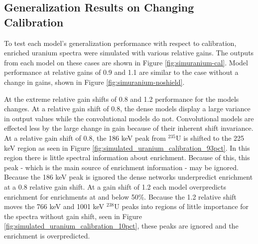 \subsection{Generalization Results on Changing Calibration} \label{section_uranium_sim_cal}

To test each model's generalization performance with respect to calibration, enriched uranium spectra were simulated with various relative gains. The outputs from each model on these cases are shown in Figure \ref{fig:simuranium-cal}. Model performance at relative gains of 0.9 and 1.1 are similar to the case without a change in gains, shown in Figure \ref{fig:simuranium-noshield}.

At the extreme relative gain shifts of 0.8 and 1.2 performance for the models changes. At a relative gain shift of 0.8, the dense models display a large variance in output values while the convolutional models do not. Convolutional models are effected less by the large change in gain because of their inherent shift invariance. At a relative gain shift of 0.8, the 186 keV peak from $^{235}$U is shifted to the 225 keV region as seen in Figure \ref{fig:simulated_uranium_calibration_93pct}. In this region there is little spectral information about enrichment. Because of this, this peak - which is the main source of enrichment information - may be ignored. Because the 186 keV peak is ignored the dense networks underpredict enrichment at a 0.8 relative gain shift. At a gain shift of 1.2 each model overpredicts enrichment for enrichments at and below 50\%. Because the 1.2 relative shift moves the 766 keV and 1001 keV $^{238}$U peaks into regions of little importance for the spectra without gain shift, seen in Figure \ref{fig:simulated_uranium_calibration_10pct}, these peaks are ignored and the enrichment is overpredicted.



